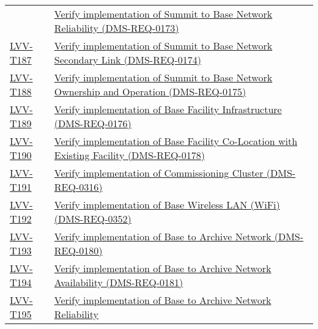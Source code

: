 \begin{longtable}[]{@{}ll@{}}
&
\href{https://jira.lsstcorp.org/secure/Tests.jspa\#/testCase/LVV-T186}{Verify
implementation of Summit to Base Network Reliability
(DMS-REQ-0173)}\tabularnewline
\protect\hyperlink{lvv-t187---verify-implementation-of-summit-to-base-network-secondary-link-dms-req-0174}{LVV-T187}
&
\href{https://jira.lsstcorp.org/secure/Tests.jspa\#/testCase/LVV-T187}{Verify
implementation of Summit to Base Network Secondary Link
(DMS-REQ-0174)}\tabularnewline
\protect\hyperlink{lvv-t188---verify-implementation-of-summit-to-base-network-ownership-and-operation-dms-req-0175}{LVV-T188}
&
\href{https://jira.lsstcorp.org/secure/Tests.jspa\#/testCase/LVV-T188}{Verify
implementation of Summit to Base Network Ownership and Operation
(DMS-REQ-0175)}\tabularnewline
\protect\hyperlink{lvv-t189---verify-implementation-of-base-facility-infrastructure-dms-req-0176}{LVV-T189}
&
\href{https://jira.lsstcorp.org/secure/Tests.jspa\#/testCase/LVV-T189}{Verify
implementation of Base Facility Infrastructure
(DMS-REQ-0176)}\tabularnewline
\protect\hyperlink{lvv-t190---verify-implementation-of-base-facility-co-location-with-existing-facility-dms-req-0178}{LVV-T190}
&
\href{https://jira.lsstcorp.org/secure/Tests.jspa\#/testCase/LVV-T190}{Verify
implementation of Base Facility Co-Location with Existing Facility
(DMS-REQ-0178)}\tabularnewline
\protect\hyperlink{lvv-t191---verify-implementation-of-commissioning-cluster-dms-req-0316}{LVV-T191}
&
\href{https://jira.lsstcorp.org/secure/Tests.jspa\#/testCase/LVV-T191}{Verify
implementation of Commissioning Cluster (DMS-REQ-0316)}\tabularnewline
\protect\hyperlink{lvv-t192---verify-implementation-of-base-wireless-lan-wifi-dms-req-0352}{LVV-T192}
&
\href{https://jira.lsstcorp.org/secure/Tests.jspa\#/testCase/LVV-T192}{Verify
implementation of Base Wireless LAN (WiFi)
(DMS-REQ-0352)}\tabularnewline
\protect\hyperlink{lvv-t193---verify-implementation-of-base-to-archive-network-dms-req-0180}{LVV-T193}
&
\href{https://jira.lsstcorp.org/secure/Tests.jspa\#/testCase/LVV-T193}{Verify
implementation of Base to Archive Network (DMS-REQ-0180)}\tabularnewline
\protect\hyperlink{lvv-t194---verify-implementation-of-base-to-archive-network-availability-dms-req-0181}{LVV-T194}
&
\href{https://jira.lsstcorp.org/secure/Tests.jspa\#/testCase/LVV-T194}{Verify
implementation of Base to Archive Network Availability
(DMS-REQ-0181)}\tabularnewline
\protect\hyperlink{lvv-t195---verify-implementation-of-base-to-archive-network-reliability-dms-req-0182}{LVV-T195}
&
\href{https://jira.lsstcorp.org/secure/Tests.jspa\#/testCase/LVV-T195}{Verify
implementation of Base to Archive Network Reliability
}
\end{longtable}
